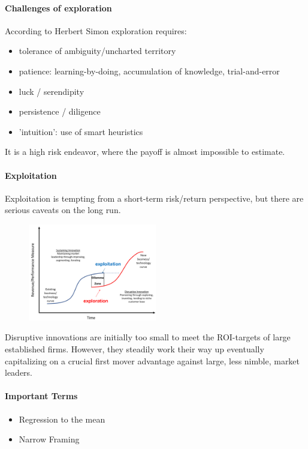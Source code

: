 \paragraph{Challenges of exploration}
According to Herbert Simon exploration requires:
\begin{itemize}
    \item tolerance of ambiguity/uncharted territory
    \item patience: learning-by-doing, accumulation of knowledge, trial-and-error
    \item luck / serendipity
    \item persistence / diligence
    \item 'intuition': use of smart heuristics
\end{itemize}
It is a high risk endeavor, where the payoff is almost impossible to estimate.

\paragraph{Exploitation}
Exploitation is tempting from a short-term risk/return perspective, but there are
serious caveats on the long run.

\begin{figure}[h]
    \centering
    \includegraphics[width=0.5\textwidth]{Pictures/exploration_exploitation_curve.png}
\end{figure}

Disruptive innovations are initially too small to meet the ROI-targets of large
established firms. However, they steadily work their way up eventually
capitalizing on a crucial first mover advantage against large, less nimble,
market leaders.

\paragraph{Important Terms}
\begin{itemize}
    \item Regression to the mean
    \item Narrow Framing
\end{itemize}

